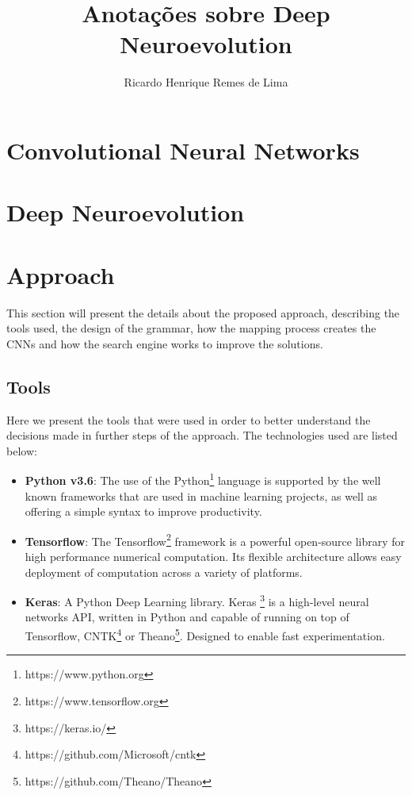 \documentclass[12pt]{article}
\title{Anotações sobre Deep Neuroevolution}
\author{Ricardo Henrique Remes de Lima \inst{1}}
\begin{document}
 

\maketitle

\section{Convolutional Neural Networks}

\section{Deep Neuroevolution}

\section{Approach}

This section will present the details about the proposed approach, describing the tools used, the design of the grammar, how the mapping process creates the CNNs and how the search engine works to improve the solutions.

\subsection{Tools}

Here we present the tools that were used in order to better understand the decisions made in further steps of the approach. The technologies used are listed below:

\begin{itemize}
	\item \textbf{Python v3.6}: The use of the Python\footnote{https://www.python.org} language is supported by the well known frameworks that are used in machine learning projects, as well as offering a simple syntax to improve productivity. 
	
	\item \textbf{Tensorflow}: The Tensorflow\footnote{https://www.tensorflow.org} framework is a powerful open-source library for high performance numerical computation. Its flexible architecture allows easy deployment of computation across a variety of platforms.
	
	\item \textbf{Keras}: A Python Deep Learning library. Keras \footnote{https://keras.io/} is a high-level neural networks API, written in Python and capable of running on top of Tensorflow, CNTK\footnote{https://github.com/Microsoft/cntk} or Theano\footnote{https://github.com/Theano/Theano}. Designed to enable fast experimentation.
\end{itemize}
\end{document}
